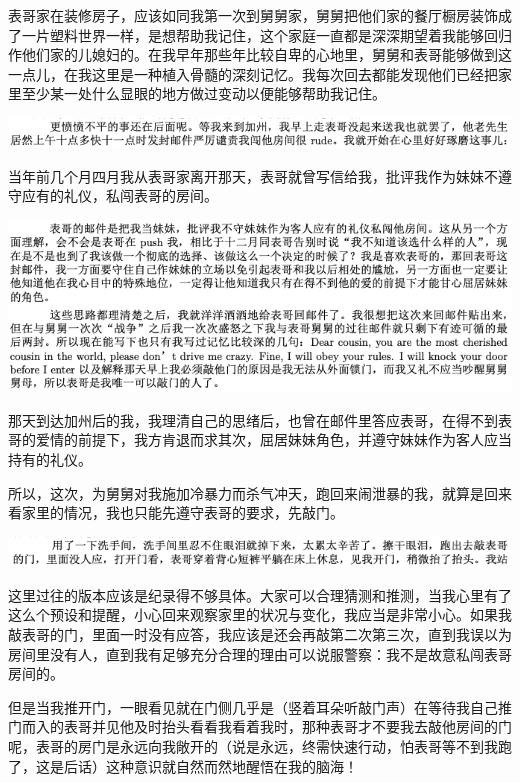 \documentclass[9pt, b5paper]{article}
\begin{document}
表哥家在装修房子，应该如同我第一次到舅舅家，舅舅把他们家的餐厅橱房装饰成了一片塑料世界一样，是想帮助我记住，这个家庭一直都是深深期望着我能够回归作他们家的儿媳妇的。在我早年那些年比较自卑的心地里，舅舅和表哥能够做到这一点儿，在我这里是一种植入骨髓的深刻记忆。我每次回去都能发现他们已经把家里至少某一处什么显眼的地方做过变动以便能够帮助我记住。

\begin{center}
\includegraphics[width=.9\linewidth]{./pic/p1p54-3.png}
\end{center}

当年前几个月四月我从表哥家离开那天，表哥就曾写信给我，批评我作为妹妹不遵守应有的礼仪，私闯表哥的房间。

\begin{center}
\includegraphics[width=.9\linewidth]{./pic/p1p55.png}
\end{center}

那天到达加州后的我，我理清自己的思绪后，也曾在邮件里答应表哥，在得不到表哥的爱情的前提下，我方肯退而求其次，屈居妹妹角色，并遵守妹妹作为客人应当持有的礼仪。

所以，这次，为舅舅对我施加冷暴力而杀气冲天，跑回来闹泄暴的我，就算是回来看家里的情况，我也只能先遵守表哥的要求，先敲门。 

\begin{center}
\includegraphics[width=.9\linewidth]{./pic/p1p67-1.png}
\end{center}

这里过往的版本应该是纪录得不够具体。大家可以合理猜测和推测，当我心里有了这么个预设和提醒，小心回来观察家里的状况与变化，我应当是非常小心。如果我敲表哥的门，里面一时没有应答，我应该是还会再敲第二次第三次，直到我误以为房间里没有人，直到我有足够充分合理的理由可以说服警察：我不是故意私闯表哥房间的。

但是当我推开门，一眼看见就在门侧几乎是（竖着耳朵听敲门声）在等待我自己推门而入的表哥并见他及时抬头看看我看着我时，那种表哥才不要我去敲他房间的门呢，表哥的房门是永远向我敞开的（说是永远，终需快速行动，怕表哥等不到我跑了，这是后话）这种意识就自然而然地醒悟在我的脑海！
\end{document}
